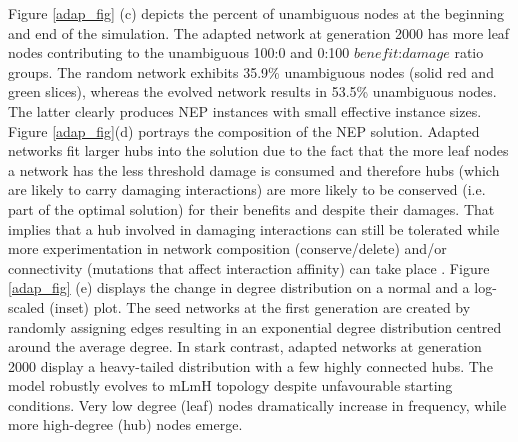 	Figure \ref{adap_fig} (c) depicts the percent of unambiguous nodes at the beginning and end of the simulation. The adapted network at generation 2000 
	has more leaf nodes contributing to the unambiguous 100:0 and 0:100 $benefit$:$damage$ ratio groups. The random network exhibits 35.9\% unambiguous nodes (solid red and green slices), whereas 
	the evolved network results in 53.5\% unambiguous nodes. The latter clearly produces NEP instances with small effective instance sizes. 
	Figure \ref{adap_fig}(d) portrays the composition of the NEP solution. Adapted networks fit larger hubs into the solution due to 
	the fact that the more leaf nodes a network has the less threshold damage is consumed and therefore hubs (which are likely to 
	carry damaging interactions) are more likely to  be conserved (i.e. part of the optimal solution) for their benefits and despite their damages. 
	That implies that a hub involved in damaging interactions 
	can still be tolerated while more experimentation in network composition (conserve/delete) and/or connectivity (mutations that 
	affect interaction affinity) can take place \cite{kim_positive_2007}. 
	Figure \ref{adap_fig} (e)  
	displays the change in degree distribution on a normal and a log-scaled (inset) plot. The seed networks at 
	the first generation are created by randomly assigning edges resulting in an 
	exponential degree distribution centred around the average degree. In stark contrast, adapted networks at generation 2000
	display a heavy-tailed distribution with a few highly
	connected hubs. The model robustly evolves to mLmH topology despite unfavourable starting conditions. Very low degree (leaf) nodes dramatically increase in 
	frequency, while more high-degree (hub) nodes emerge. 
%
